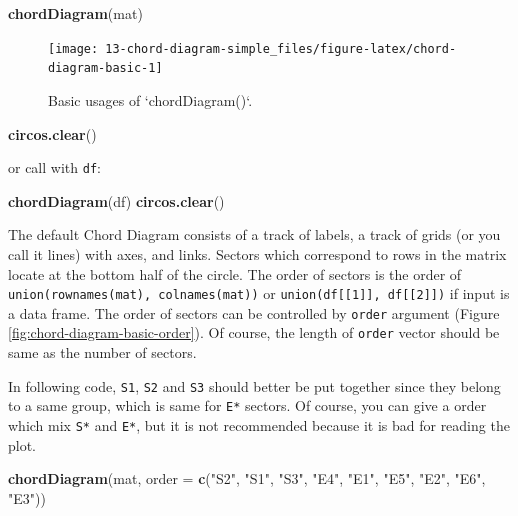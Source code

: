 \documentclass[]{book}
\newenvironment{Shaded}{\begin{snugshade}}{\end{snugshade}}
\newcommand{\KeywordTok}[1]{\textcolor[rgb]{0.13,0.29,0.53}{\textbf{#1}}}
\newcommand{\DataTypeTok}[1]{\textcolor[rgb]{0.13,0.29,0.53}{#1}}
\newcommand{\StringTok}[1]{\textcolor[rgb]{0.31,0.60,0.02}{#1}}
\newcommand{\NormalTok}[1]{#1}
\begin{document}
\begin{Shaded}
\begin{Highlighting}[]
\KeywordTok{chordDiagram}\NormalTok{(mat)}
\end{Highlighting}
\end{Shaded}

\begin{figure}

{\centering \texttt{[image: 13-chord-diagram-simple\_files/figure-latex/chord-diagram-basic-1]} 

}

\caption{Basic usages of `chordDiagram()`.}\label{fig:chord-diagram-basic}
\end{figure}

\begin{Shaded}
\begin{Highlighting}[]
\KeywordTok{circos.clear}\NormalTok{()}
\end{Highlighting}
\end{Shaded}

or call with \texttt{df}:

\begin{Shaded}
\begin{Highlighting}[]
\KeywordTok{chordDiagram}\NormalTok{(df)}
\KeywordTok{circos.clear}\NormalTok{()}
\end{Highlighting}
\end{Shaded}

The default Chord Diagram consists of a track of labels, a track of
grids (or you call it lines) with axes, and links. Sectors which
correspond to rows in the matrix locate at the bottom half of the
circle. The order of sectors is the order of
\texttt{union(rownames(mat),\ colnames(mat))} or
\texttt{union(df{[}{[}1{]}{]},\ df{[}{[}2{]}{]})} if input is a data
frame. The order of sectors can be controlled by \texttt{order} argument
(Figure \ref{fig:chord-diagram-basic-order}). Of course, the length of
\texttt{order} vector should be same as the number of sectors.

In following code, \texttt{S1}, \texttt{S2} and \texttt{S3} should
better be put together since they belong to a same group, which is same
for \texttt{E*} sectors. Of course, you can give a order which mix
\texttt{S*} and \texttt{E*}, but it is not recommended because it is bad
for reading the plot.

\begin{Shaded}
\begin{Highlighting}[]
\KeywordTok{chordDiagram}\NormalTok{(mat, }\DataTypeTok{order =} \KeywordTok{c}\NormalTok{(}\StringTok{"S2"}\NormalTok{, }\StringTok{"S1"}\NormalTok{, }\StringTok{"S3"}\NormalTok{, }\StringTok{"E4"}\NormalTok{, }\StringTok{"E1"}\NormalTok{, }\StringTok{"E5"}\NormalTok{, }\StringTok{"E2"}\NormalTok{, }\StringTok{"E6"}\NormalTok{, }\StringTok{"E3"}\NormalTok{))}
\end{Highlighting}
\end{Shaded}
\end{document}
